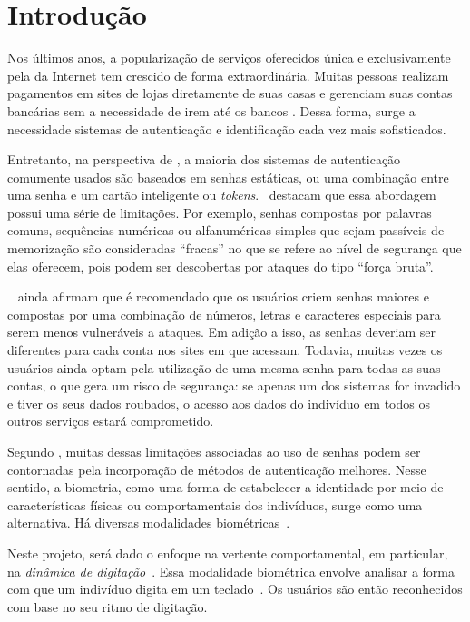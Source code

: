 \section{Introdução}\label{sec:introduacao}

Nos últimos anos, a popularização de serviços oferecidos única e exclusivamente pela da Internet tem crescido de forma extraordinária. Muitas pessoas realizam pagamentos em sites de lojas diretamente de suas casas e gerenciam suas contas bancárias sem a necessidade de irem até os bancos \cite{seguranca_de_dados}. Dessa forma, surge a necessidade sistemas de autenticação e identificação cada vez mais sofisticados.

Entretanto, na perspectiva de , a maioria dos sistemas de autenticação comumente usados são baseados em senhas estáticas, ou uma combinação entre uma senha e um cartão inteligente ou \textit{tokens}.~ destacam que essa abordagem possui uma série de limitações. Por exemplo, senhas compostas por palavras comuns, sequências numéricas ou alfanuméricas simples que sejam passíveis de memorização são consideradas ``fracas'' no que se refere ao nível de segurança que elas oferecem, pois podem ser descobertas por ataques do tipo ``força bruta''.

~ ainda afirmam que é recomendado que os usuários criem senhas maiores e compostas por uma combinação de números, letras e caracteres especiais para serem menos vulneráveis a ataques. Em adição a isso, as senhas deveriam ser diferentes para cada conta nos sites em que acessam. Todavia, muitas vezes os usuários ainda optam pela utilização de uma mesma senha para todas as suas contas, o que gera um risco de segurança: se apenas um dos sistemas for invadido e tiver os seus dados roubados, o acesso aos dados do indivíduo em todos os outros serviços estará comprometido.

Segundo , muitas dessas limitações associadas ao uso de senhas podem ser contornadas pela incorporação de métodos de autenticação melhores. Nesse sentido, a biometria, como uma forma de estabelecer a identidade por meio de características físicas ou comportamentais dos indivíduos, surge como uma alternativa. Há diversas modalidades biométricas~\cite{Jain2016_50Years}.

Neste projeto, será dado o enfoque na vertente comportamental, em particular, na \textit{dinâmica de digitação}~\cite{Roy2022systematic}. Essa modalidade biométrica envolve analisar a forma com que um indivíduo digita em um teclado~\cite{monrose2000keystroke}. Os usuários são então reconhecidos com base no seu ritmo de digitação.

